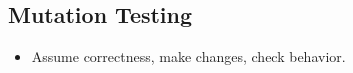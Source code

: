 \documentclass[10pt,portrait]{article}
\begin{document}
\begin{multicols}{ 3 }
\subsection*{Mutation Testing}
\begin{itemize}
    \item Assume correctness, make changes, check behavior.
\end{itemize}
\end{multicols}
\end{document}
